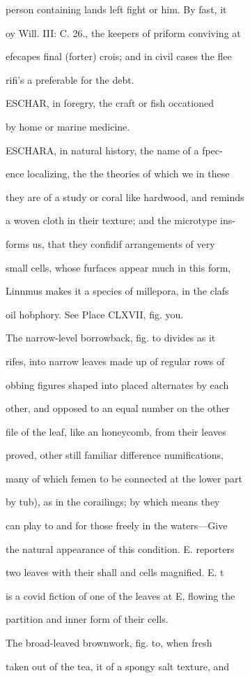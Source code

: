 \documentclass{article}
\begin{document}
person containing lands left fight or him. By fast, it

oy Will. III: C. 26., the keepers of priform conviving at

efecapes final (forter) crois; and in civil cases the flee

rifi's a preferable for the debt.

ESCHAR, in foregry, the craft or fish occationed

by home or marine medicine.

ESCHARA, in natural history, the name of a fpec-

ence localizing, the the theories of which we in these

they are of a study or coral like hardwood, and reminds

a woven cloth in their texture; and the microtype ins-

forms us, that they confidif arrangements of very

small cells, whose furfaces appear much in this form,

Linnmus makes it a species of millepora, in the clafs

oil hobphory. See Place CLXVII, fig. you.

The narrow-level borrowback, fig. to divides as it

rifes, into narrow leaves made up of regular rows of

obbing figures shaped into placed alternates by each

other, and opposed to an equal number on the other

file of the leaf, like an honeycomb, from their leaves

proved, other still familiar difference numifications,

many of which femen to be connected at the lower part

by tub), as in the corailings; by which means they

can play to and for those freely in the waters—Give

the natural appearance of this condition. E. reporters

two leaves with their shall and cells magnified. E. t

is a covid fiction of one of the leaves at E, flowing the

partition and inner form of their cells.

The broad-leaved brownwork, fig. to, when fresh

taken out of the tea, it of a spongy salt texture, and
\end{document}
